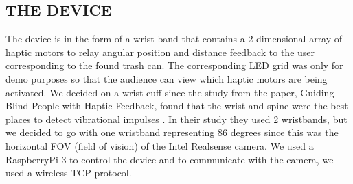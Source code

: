 \documentclass{article}
\begin{document}
\subsection{THE DEVICE}
\label{ssec:thedevice}

The device is in the form of a wrist band that contains a 2-dimensional array of haptic motors to relay angular position and distance feedback to the user corresponding to the found trash can. The corresponding LED grid was only for demo purposes so that the audience can view which haptic motors are being activated. We decided on a wrist cuff since the study from the paper, Guiding Blind People with Haptic Feedback, found that the wrist and spine were the best places to detect vibrational impulses \cite{guiding_blind}. In their study they used 2 wristbands, but we decided to go with one wristband representing 86 degrees since this was the horizontal FOV (field of vision) of the Intel Realsense camera. We used a RaspberryPi 3 to control the device and to communicate with the camera, we used a wireless TCP protocol.
\end{document}

